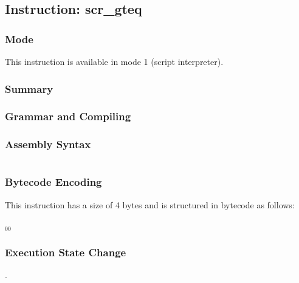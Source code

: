 \subsection{Instruction: scr\_gteq}

\subsubsection{Mode}
This instruction is available in mode 1 (script interpreter).
\subsubsection{Summary}


\subsubsection{Grammar and Compiling}


\subsubsection{Assembly Syntax}

\begin{myquote}
\begin{verbatim}

\end{verbatim}
\end{myquote}

\subsubsection{Bytecode Encoding}

This instruction has a size of 4 bytes and is structured in bytecode as follows:

$_{00}$\ 


\subsubsection{Execution State Change}

.


